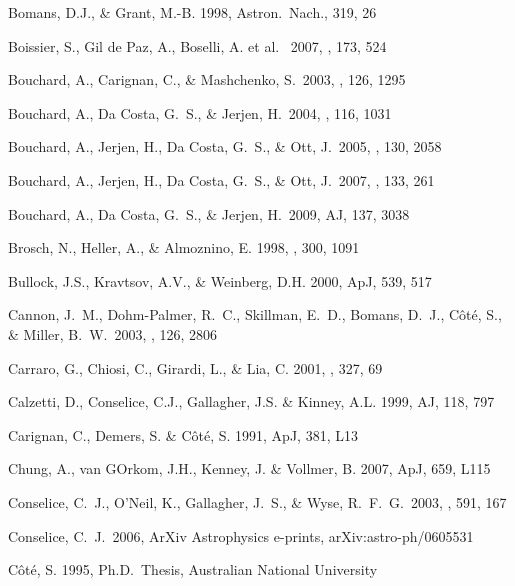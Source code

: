 \documentclass[12pt,preprint]{emulateapj}
\begin{document}
\begin{thebibliography}{}
Bomans, D.J., \& Grant, M.-B. 1998, Astron.\ Nach., 319, 26

Boissier, S., Gil de Paz, A., Boselli, A. et al. \ 2007, \apj, 173, 524 

Bouchard, A., Carignan, C., \& Mashchenko, S.\ 2003, \aj, 126, 1295 

Bouchard, A., Da Costa, G.~S., \& Jerjen, H.\ 2004, \pasp, 116, 1031 

Bouchard, A., Jerjen, H., Da Costa, G.~S., \& Ott, J.\ 2005, \aj, 130, 2058 

Bouchard, A., Jerjen, H., Da Costa, G.~S., \& Ott, J.\ 2007, \aj, 133, 261 

Bouchard, A., Da Costa, G.~S., \& Jerjen, H.\ 2009, AJ, 137, 3038

Brosch, N., Heller, A., \& Almoznino, E. 1998, \mnras , 300, 1091

Bullock, J.S., Kravtsov, A.V., \& Weinberg, D.H. 2000, ApJ, 539, 517

Cannon, J.~M., Dohm-Palmer, R.~C., Skillman, E.~D., Bomans, D.~J., 
C{\^o}t{\'e}, S., \& Miller, B.~W.\ 2003, \aj, 126, 2806 

Carraro, G., Chiosi, C., Girardi, L., \& Lia, C. 2001, \mnras, 327, 69 

Calzetti, D., Conselice, C.J., Gallagher, J.S. \& Kinney, A.L. 1999, AJ, 118, 797

Carignan, C., Demers, S. \& C\^ot\'e, S. 1991, ApJ, 381, L13

Chung, A., van GOrkom, J.H., Kenney, J. \& Vollmer, B. 2007, ApJ, 659, L115 

Conselice, C.~J., O'Neil, K., Gallagher, J.~S., \& Wyse, R.~F.~G.\ 2003, \apj, 591, 167 

Conselice, C.~J.\ 2006, ArXiv Astrophysics e-prints, arXiv:astro-ph/0605531 

C\^ot\'e, S. 1995, Ph.D.\ Thesis, Australian National University


\end{thebibliography}
\end{document}
